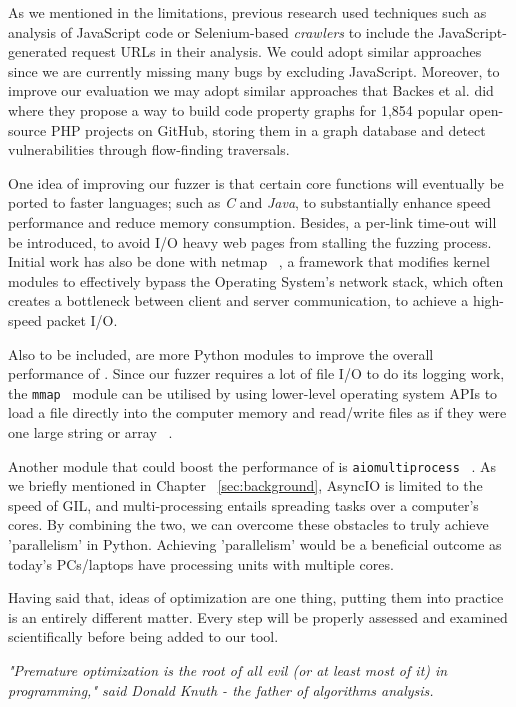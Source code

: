 As we mentioned in the limitations, previous research used techniques such as analysis of JavaScript code or Selenium-based \emph{crawlers} to include the JavaScript-generated request URLs in their analysis. We could adopt similar approaches since we are currently missing many bugs by excluding JavaScript. Moreover, to improve our evaluation we may adopt similar approaches that Backes et al. did  ~\cite{efficient2017} where they propose a way to build code property graphs for 1,854 popular open-source PHP projects on GitHub, storing them in a graph database and detect vulnerabilities through flow-finding traversals.

One idea of improving our fuzzer is that certain core functions will eventually be ported to faster languages; such as \emph{C} and \emph{Java}, to substantially enhance speed performance and reduce memory consumption. Besides, a per-link time-out will be introduced, to avoid I/O heavy web pages from stalling the fuzzing process. Initial work has also be done with netmap  ~\cite{rizzo2011Netmap}, a framework that modifies kernel modules to effectively bypass the Operating System's network stack, which often creates a bottleneck between client and server communication, to achieve a high-speed packet I/O.

Also to be included, are more Python modules to improve the overall performance of \pname{}. Since our fuzzer requires a lot of file I/O to do its logging work, the {\tt mmap } module can be utilised by using lower-level operating system APIs to load a file directly into the computer memory and read/write files as if they were one large string or array ~\cite{mmap}. 

Another module that could boost the performance of \pname{} is {\tt aiomultiprocess} ~\cite{aiomultiprocess}. As we briefly mentioned in Chapter ~\ref{sec:background}, AsyncIO is limited to the speed of GIL, and multi-processing entails spreading tasks over a computer's cores. By combining the two, we can overcome these obstacles to truly achieve 'parallelism' in Python. Achieving 'parallelism' would be a beneficial outcome as today's PCs/laptops have processing units with multiple cores.

Having said that, ideas of optimization are one thing, putting them into practice is an entirely different matter. Every step will be properly assessed and examined scientifically before being added to our tool.

\textit{"Premature optimization is the root of all evil (or at least most of it) in programming," said Donald Knuth - the father of algorithms analysis.}